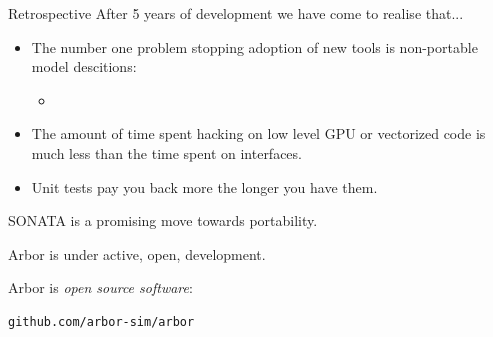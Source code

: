 \documentclass[aspectratio=43]{beamer}
\newcommand{\arbor}{{\ttfamily Arbor}\xspace}
\begin{document}

\begin{frame}[fragile]{Retrospective}
    After 5 years of development we have come to realise that...
    \begin{itemize}
        \item The number one problem stopping adoption of new tools is non-portable model descitions:
        \begin{itemize}
            \item 
        \end{itemize}
        \item The amount of time spent hacking on low level GPU or vectorized code is much less than the time spent on interfaces.
        \item Unit tests pay you back more the longer you have them.
    \end{itemize}
    \vspace{10pt}
    SONATA is a promising move towards portability.
\end{frame}

\begin{frame}[fragile]{}
    \arbor is under active, open, development.

    \vspace{10pt}

    \begin{center}
        \arbor is \emph{open source software}:\\
        \vspace{3pt}
        \begin{lstlisting}[style=talkpseudo]
                  github.com/arbor-sim/arbor
        \end{lstlisting}
    \end{center}
\end{frame}
\end{document}
